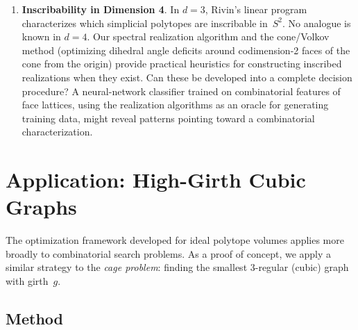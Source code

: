 \documentclass[11pt]{article}
\begin{document}
\begin{enumerate}
    For $d \geq 5$, a natural candidate is the Hodge
    1-Laplacian $L_1 = B_1 B_1^T + B_2 B_2^T$ acting on
    edges~\cite{Forman2003}, where $B_1$ and $B_2$ are the
    boundary operators of the simplicial complex.  The
    up-Laplacian $L_1^{\mathrm{up}} = B_2 B_2^T$ encodes
    triangle co-incidence, carrying information beyond the
    1-skeleton.  Preliminary experiments show that the naive
    approach (project $L_1$ eigenvectors back to vertices
    by averaging over incident edges) does not improve over
    $L_0$ in $d \geq 5$; the projection step discards the
    higher-order structure.  A more principled approach---using
    the edge-level embedding to reconstruct the Gram matrix
    directly, or using sheaf Laplacians that preserve the
    fiber structure---may succeed.

    \item \textbf{Inscribability in Dimension 4}.
    In $d = 3$, Rivin's linear program characterizes which
    simplicial polytopes are inscribable in~$S^2$.  No analogue
    is known in $d = 4$.  Our spectral realization algorithm
    and the cone/Volkov method (optimizing dihedral angle deficits
    around codimension-2 faces of the cone from the origin)
    provide practical heuristics for constructing inscribed
    realizations when they exist.  Can these be developed into
    a complete decision procedure?  A neural-network classifier
    trained on combinatorial features of face lattices, using
    the realization algorithms as an oracle for generating
    training data, might reveal patterns pointing toward a
    combinatorial characterization.
\end{enumerate}

\section{Application: High-Girth Cubic Graphs}
\label{sec:cages}

The optimization framework developed for ideal polytope volumes
applies more broadly to combinatorial search problems.  As a proof
of concept, we apply a similar strategy to the \emph{cage problem}:
finding the smallest $3$-regular (cubic) graph with girth~$g$.

\subsection{Method}
\end{document}
